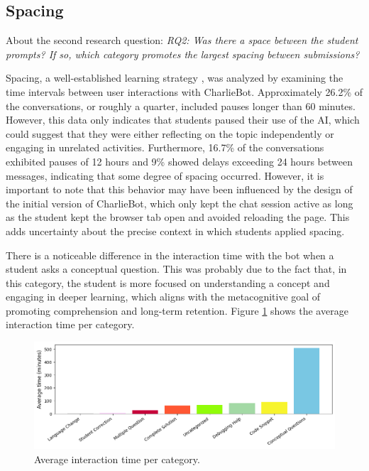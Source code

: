 \documentclass[a4paper,twoside]{article}
\begin{document}
\subsection{Spacing}


About the second research question: \textit{RQ2: Was there a space between the
student prompts? If so, which category promotes the largest spacing between
submissions?}

Spacing, a well-established learning strategy \citep{Carvalho20}, was analyzed
by examining the time intervals between user interactions with CharlieBot.
Approximately 26.2\% of the conversations, or roughly a quarter, included pauses
longer than 60 minutes. However, this data only indicates that students paused
their use of the AI, which could suggest that they were either reflecting on the
topic independently or engaging in unrelated activities. Furthermore, 16.7\%
of the conversations exhibited pauses of 12 hours and 9\% showed delays
exceeding 24 hours between messages, indicating that some degree of spacing
occurred. However, it is important to note that this behavior may have been
influenced by the design of the initial version of CharlieBot, which only kept
the chat session active as long as the student kept the browser tab open and
avoided reloading the page. This adds uncertainty about the precise context in
which students applied spacing.

There is a noticeable difference in the interaction time with the bot when a
student asks a conceptual question. This was probably due to the fact that, in
this category, the student is more focused on understanding a concept and
engaging in deeper learning, which aligns with the metacognitive goal of
promoting comprehension and long-term retention. Figure \ref{fig:graph3}
shows the average interaction time per category.

\begin{figure}[htbp]
  \centering
  \includegraphics[scale=0.55]{img/figure3.png}
  \caption{Average interaction time per category.}
  \label{fig:graph3}
\end{figure}
\end{document}
